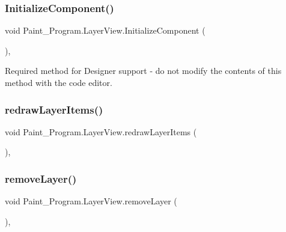\subsubsection{\texorpdfstring{Initialize\+Component()}{InitializeComponent()}}
{\footnotesize\ttfamily void Paint\+\_\+\+Program.\+Layer\+View.\+Initialize\+Component (\begin{DoxyParamCaption}{ }\end{DoxyParamCaption})\hspace{0.3cm}{\ttfamily [inline]}, {\ttfamily [private]}}



Required method for Designer support -\/ do not modify the contents of this method with the code editor. 

\mbox{\label{class_paint___program_1_1_layer_view_a3aea3b23c16f637b1e71c6e124c0d1ed}} 
\subsubsection{\texorpdfstring{redraw\+Layer\+Items()}{redrawLayerItems()}}
{\footnotesize\ttfamily void Paint\+\_\+\+Program.\+Layer\+View.\+redraw\+Layer\+Items (\begin{DoxyParamCaption}{ }\end{DoxyParamCaption})\hspace{0.3cm}{\ttfamily [inline]}, {\ttfamily [private]}}

\mbox{\label{class_paint___program_1_1_layer_view_ac0005cdabdf8818860cc85ec9a9620c7}} 
\subsubsection{\texorpdfstring{remove\+Layer()}{removeLayer()}}
{\footnotesize\ttfamily void Paint\+\_\+\+Program.\+Layer\+View.\+remove\+Layer (\begin{DoxyParamCaption}{ }\end{DoxyParamCaption})\hspace{0.3cm}{\ttfamily [inline]}, {\ttfamily [private]}}


